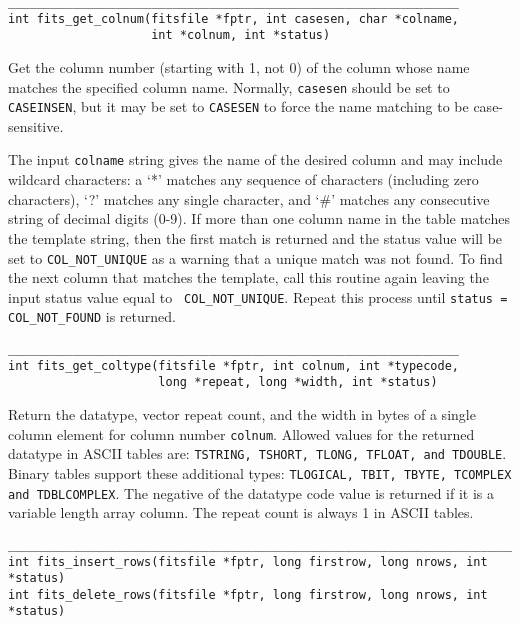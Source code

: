 \documentclass[11pt]{article}
\begin{document}
\begin{verbatim}
_______________________________________________________________
int fits_get_colnum(fitsfile *fptr, int casesen, char *colname,
                    int *colnum, int *status)
\end{verbatim}

Get the  column number (starting with 1, not 0) of the column whose
name matches the specified column name.   Normally, {\tt casesen} should
be set to {\tt CASEINSEN}, but it may be set to {\tt CASESEN} to force
the name matching to be case-sensitive.

The input {\tt colname} string gives the name of the desired column and
may include wildcard characters:  a `*' matches any sequence of
characters (including zero characters), `?' matches any single
character, and `\#' matches any consecutive string of decimal digits
(0-9).  If more than one column name in the table matches the template
string, then the first match is returned and the status value will be
set to {\tt COL\_NOT\_UNIQUE}  as a warning that a unique match was not
found.  To find the next column that matches the template, call this
routine again leaving the input status value equal to {\tt
COL\_NOT\_UNIQUE}.  Repeat this process until {\tt status =
COL\_NOT\_FOUND}  is returned.

\begin{verbatim}
_______________________________________________________________
int fits_get_coltype(fitsfile *fptr, int colnum, int *typecode,
                     long *repeat, long *width, int *status)
\end{verbatim}

Return the datatype, vector repeat count, and the width in bytes of a
single column element for column number {\tt colnum}.  Allowed values
for the returned datatype in ASCII tables are:  {\tt TSTRING, TSHORT,
TLONG, TFLOAT, and TDOUBLE}.  Binary tables support these additional
types: {\tt TLOGICAL, TBIT, TBYTE, TCOMPLEX and TDBLCOMPLEX}.  The
negative of the datatype code value is returned if it is a variable
length array column.  The repeat count is always 1 in ASCII tables.

\begin{verbatim}
____________________________________________________________________________
int fits_insert_rows(fitsfile *fptr, long firstrow, long nrows, int *status)
int fits_delete_rows(fitsfile *fptr, long firstrow, long nrows, int *status)
\end{verbatim}
\end{document}
